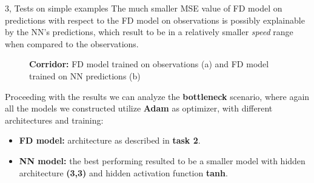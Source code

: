 \documentclass[10pt,a4paper]{article}
\begin{document}
\begin{task}{3, Tests on simple examples}
The much smaller MSE value of FD model on predictions with respect to the FD model on observations is possibly explainable by the NN's predictions, which result to be in a relatively smaller \textit{speed} range when compared to the observations.

\begin{figure}[H]
    \centering
    \hfill
    \caption{\textbf{Corridor: }FD model trained on observations (a) and FD model trained on NN predictions (b)}
    \label{fig:vadere-corridor-result}
\end{figure}

Proceeding with the results we can analyze the \textbf{bottleneck} scenario, where again all the models we constructed utilize \textbf{Adam} as optimizer, with different architectures and training:
\begin{itemize}
    \item \textbf{FD model:} architecture as described in \textbf{task 2}.
    \item \textbf{NN model:} the best performing resulted to be a smaller model with hidden architecture \textbf{(3,3)} and hidden activation function \textbf{tanh}.
\end{itemize}


\end{task}
\end{document}
